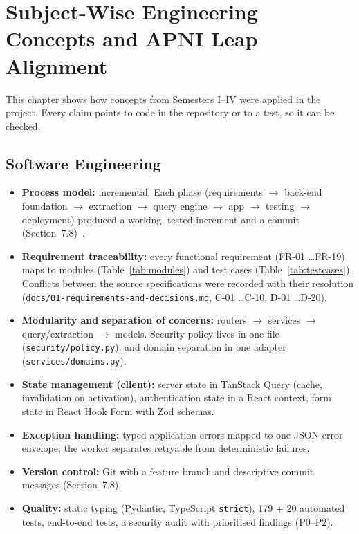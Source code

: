 \section{Subject-Wise Engineering Concepts and APNI Leap Alignment}
This chapter shows how concepts from Semesters I--IV were applied in the project. Every claim points
to code in the repository or to a test, so it can be checked.

\subsection{Software Engineering}
\begin{itemize}
\item \textbf{Process model:} incremental. Each phase (requirements $\rightarrow$ back-end foundation
      $\rightarrow$ extraction $\rightarrow$ query engine $\rightarrow$ app $\rightarrow$ testing
      $\rightarrow$ deployment) produced a working, tested increment and a commit
      (Section~7.8)~\cite{sommerville}.
\item \textbf{Requirement traceability:} every functional requirement (FR-01 \ldots FR-19) maps to
      modules (Table~\ref{tab:modules}) and test cases (Table~\ref{tab:testcases}). Conflicts between the
      source specifications were recorded with their resolution (\texttt{docs/01-requirements-and-decisions.md},
      C-01 \ldots C-10, D-01 \ldots D-20).
\item \textbf{Modularity and separation of concerns:} routers $\rightarrow$ services $\rightarrow$
      query/extraction $\rightarrow$ models. Security policy lives in one file
      (\texttt{security/policy.py}), and domain separation in one adapter (\texttt{services/domains.py}).
\item \textbf{State management (client):} server state in TanStack Query (cache, invalidation on
      activation), authentication state in a React context, form state in React Hook Form with Zod schemas.
\item \textbf{Exception handling:} typed application errors mapped to one JSON error envelope; the
      worker separates retryable from deterministic failures.
\item \textbf{Version control:} Git with a feature branch and descriptive commit messages (Section~7.8).
\item \textbf{Quality:} static typing (Pydantic, TypeScript \texttt{strict}), 179 + 20 automated tests,
      end-to-end tests, a security audit with prioritised findings (P0--P2).
\end{itemize}

